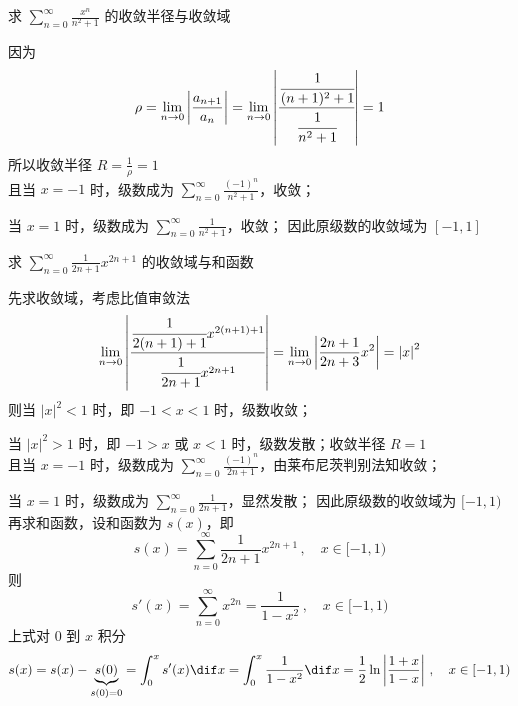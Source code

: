 \documentclass[color=green,titlestyle=hang]{elegantbook}%
\begin{document}
\begin{example}
求 $\sum_{n=0}^{\infty}\frac{x^n}{n^2+1}$ 的收敛半径与收敛域
\end{example}\begin{Solution}因为
\[\rho=\lim_{n\to0}\left|\frac{a_{n+1}}{a_n}\right|=\lim_{n\to0}\left|\cfrac{\cfrac{1}{(n+1)^2+1}}{\cfrac{1}{n^2+1}}\right|=1\]
所以{\color{red}收敛半径 $R=\frac{1}{\rho}=1$}\\
且当  $x=-1$ 时，级数成为 $\sum_{n=0}^{\infty}\frac{(-1)^n}{n^2+1}$，收敛；\\
\par\setlength{\parindent}{1em}当  $x=1$ 时，级数成为 $\sum_{n=0}^{\infty}\frac{1}{n^2+1}$，收敛；
因此原级数的{\color{red}收敛域为 $[-1,1]$}	
\end{Solution}

\begin{example}
求 $\sum_{n=0}^{\infty}\frac{1}{2n+1}x^{2n+1}$ 的收敛域与和函数
\end{example}\begin{Solution}先求收敛域，考虑比值审敛法
\[\lim_{n\to0}\left|\cfrac{\cfrac{1}{2(n+1)+1}x^{2(n+1)+1}}{\cfrac{1}{2n+1}x^{2n+1}}\right|=\lim_{n\to0}\left|\frac{2n+1}{2n+3}x^2\right|=\left|x\right|^2\]
则当 $\left|x\right|^2<1$ 时，即 $-1<x<1$ 时，级数收敛；\\
\par\setlength{\parindent}{1em}当 $\left|x\right|^2>1$ 时，即 $-1>x$ 或 $x<1$ 时，级数发散；{\color{blue}收敛半径 $R=1$}\\
且当  $x=-1$ 时，级数成为 $\sum_{n=0}^{\infty}\frac{(-1)^n}{2n+1}$，由莱布尼茨判别法知收敛；\\
\par 当  $x=1$ 时，级数成为 $\sum_{n=0}^{\infty}\frac{1}{2n+1}$，显然发散；
因此原级数的{\color{red}收敛域为 $[-1,1)$}\\
再求和函数，设和函数为 $s(x)$，即
\[s(x)=\sum_{n=0}^{\infty}\frac{1}{2n+1}x^{2n+1}\,,\quad x\in[-1,1)\]
则 \[s'(x)=\sum_{n=0}^{\infty}x^{2n}=\frac{1}{1-x^2}\,,\quad x\in[-1,1)\]
上式对 $0$ 到 $x$ 积分
\[s(x)=s(x)-\underbrace{s(0)}\limits_{s(0)=0}=\int_{0}^{x}s'(x)\dif x=\int_{0}^{x}\frac{1}{1-x^2}\dif x=\frac{1}{2}\ln\left|\frac{1+x}{1-x}\right|\,,\quad x\in[-1,1)\]	
\end{Solution}
\end{document}
